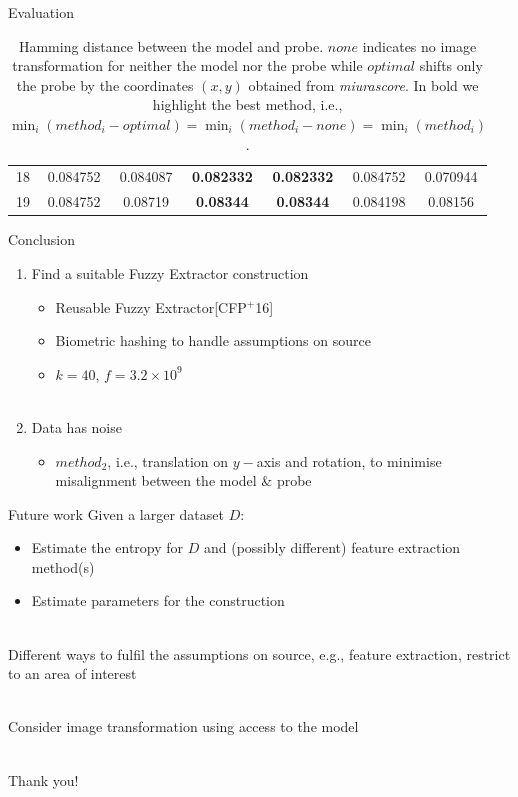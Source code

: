 \documentclass{beamer}
\def\fe{Fuzzy Extractor\xspace}
\def\rfe{Reusable Fuzzy Extractor\xspace}
\begin{document}
\begin{frame}{Evaluation}
\begin{table}[t]
\begin{tabular}{c|c|c|c|c|c|c}
18  & 0.084752 & 0.084087 & \textbf{0.082332} & \textbf{0.082332} & 0.084752 & 0.070944 \\
19  & 0.084752 & 0.08719 & \textbf{0.08344} & \textbf{0.08344} & 0.084198 & 0.08156
    \end{tabular}
    \caption{Hamming distance between the model and probe. $none$ indicates no image transformation for neither the model nor the probe while $optimal$ shifts only the probe by the coordinates $(x,y)$ obtained from \textit{miurascore}. In bold we highlight the best method, i.e., $\min_i(method_i - optimal) = \min_i(method_i - none) = \min_i(method_i)$.}
    \label{tab:hdms}
\end{table}
\end{frame}
\begin{frame}{Conclusion}
\begin{enumerate}
   \item Find a suitable \fe construction
   \begin{itemize}
       \item \rfe [CFP$^{+}$16]
       \item Biometric hashing to handle assumptions on source
       \item $k=40$, $f=3.2 \times 10^9$\\~
   \end{itemize}

   \item Data has noise
   \begin{itemize}
       \item $method_2$, i.e., translation on $y-$axis and rotation, to minimise misalignment between the model \& probe
   \end{itemize}
    
\end{enumerate} 
\end{frame}

\begin{frame}{Future work}
Given a larger dataset $D$:
\begin{itemize}
    \item Estimate the entropy for $D$ and (possibly different) feature extraction method(s)~\pause
    \item Estimate parameters for the construction\\~\pause
\end{itemize}

Different ways to fulfil the assumptions on source, e.g., feature extraction, restrict to an area of interest\\~\pause

Consider image transformation using access to the model\\~\pause

\centering \large\textcolor{dred}{Thank you!}
\end{frame}
\end{document}
